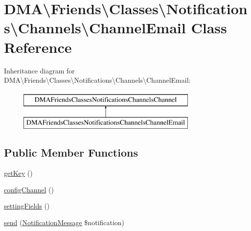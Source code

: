 \hypertarget{classDMA_1_1Friends_1_1Classes_1_1Notifications_1_1Channels_1_1ChannelEmail}{\section{D\+M\+A\textbackslash{}Friends\textbackslash{}Classes\textbackslash{}Notifications\textbackslash{}Channels\textbackslash{}Channel\+Email Class Reference}
\label{classDMA_1_1Friends_1_1Classes_1_1Notifications_1_1Channels_1_1ChannelEmail}
}
Inheritance diagram for D\+M\+A\textbackslash{}Friends\textbackslash{}Classes\textbackslash{}Notifications\textbackslash{}Channels\textbackslash{}Channel\+Email\+:\begin{figure}[H]
\begin{center}
\leavevmode
\includegraphics[height=2.000000cm]{dd/d1a/classDMA_1_1Friends_1_1Classes_1_1Notifications_1_1Channels_1_1ChannelEmail}
\end{center}
\end{figure}
\subsection*{Public Member Functions}
\begin{DoxyCompactItemize}
\item 
\hyperlink{classDMA_1_1Friends_1_1Classes_1_1Notifications_1_1Channels_1_1ChannelEmail_afeeb39b1455f8f0dc5981dea1354cf9b}{get\+Key} ()
\item 
\hyperlink{classDMA_1_1Friends_1_1Classes_1_1Notifications_1_1Channels_1_1ChannelEmail_aa1435fd7c5b6aa3119cbaedf08277275}{config\+Channel} ()
\item 
\hyperlink{classDMA_1_1Friends_1_1Classes_1_1Notifications_1_1Channels_1_1ChannelEmail_a5e2c8c7c67de35cd99f5cdd9b4cc31cd}{setting\+Fields} ()
\item 
\hyperlink{classDMA_1_1Friends_1_1Classes_1_1Notifications_1_1Channels_1_1ChannelEmail_a92161c6ed146cfef431ae1deafd0d751}{send} (\hyperlink{classDMA_1_1Friends_1_1Classes_1_1Notifications_1_1NotificationMessage}{Notification\+Message} \$notification)
\end{DoxyCompactItemize}


